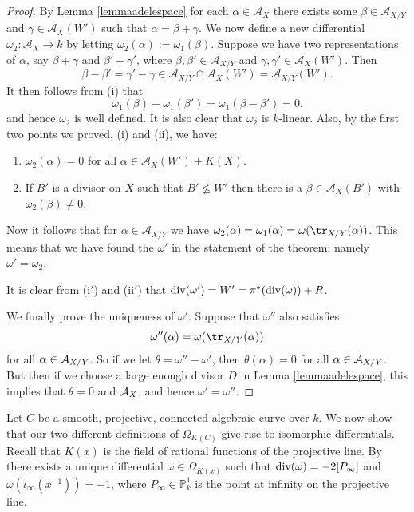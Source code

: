 \begin{proof}
    By Lemma \ref{lemmaadelespace} for each $\alpha \in \mathcal{A}_X$ there exists some $\beta \in \mathcal{A}_{X/Y}$ and $\gamma \in \mathcal{A}_X(W')$ such that $\alpha = \beta + \gamma$.
    We now define a new differential $\omega_2 \colon  \mathcal{A}_X \rightarrow k$ by letting $\omega_2(\alpha) := \omega_1(\beta)$.
    Suppose we have two representations of $\alpha$, say $\beta+ \gamma$ and $\beta' + \gamma'$, where $\beta, \beta' \in \mathcal{A}_{X/Y}$ and $\gamma, \gamma' \in \mathcal{A}_{X}(W')$.
    Then 
        \[
        \beta - \beta' = \gamma' - \gamma \in \mathcal{A}_{X/Y} \cap \mathcal{A}_X(W') = \mathcal{A}_{X/Y}(W').
        \]
    It then follows from (i) that 
        \[
        \omega_1(\beta) - \omega_1(\beta') = \omega_1(\beta - \beta') = 0.
        \]
    and hence $\omega_2$ is well defined.
    It is also clear that $\omega_2$ is $k$-linear.
    Also, by the first two points we proved, (i) and (ii), we have:
        \begin{enumerate}[(i$'$)]
        \item $\omega_2(\alpha) = 0$ for all $\alpha \in \mathcal{A}_X(W') + K(X)$.
        \item If $B'$ is a divisor on $X$ such that $B'\nleq W'$ then there is a $\beta \in \mathcal{A}_X(B')$ with $\omega_2(\beta) \neq 0$.
        \end{enumerate}
    
    
    Now it follows that for $\alpha \in \mathcal{A}_{X/Y}$ we have $\omega_2(\alpha) = \omega_1(\alpha) = \omega(\tr_{X/Y}(\alpha))$.
    This means that we have found the $\omega'$ in the statement of the theorem; namely $\omega' = \omega_2$.
    
    It is clear from (i$'$) and (ii$'$) that $\operatorname{div}(\omega') = W' = \pi^*(\operatorname{div}(\omega)) + R$.
    
    We finally prove the uniqueness of $\omega'$.
    Suppose that $\omega''$ also satisfies 
        \[
        \omega''(\alpha) = \omega(\tr_{X/Y}(\alpha))
        \]
    for all $\alpha\in {\mathcal A}_{X/Y}$.
    So if we let $\theta = \omega'' - \omega'$, then $\theta(\alpha) = 0$ for all $\alpha \in {\mathcal A}_{X/Y}$.
    But then if we choose a large enough divisor $D$ in Lemma \ref{lemmaadelespace}, this implies that $\theta = 0$ and ${\mathcal A}_X$, and hence $\omega' = \omega''$.
    \end{proof}





Let $C$ be a smooth, projective, connected algebraic curve over $k$.
We now show that our two different definitions of $\Omega_{K(C)}$ give rise to isomorphic differentials.
Recall that $K(x)$ is the field of rational functions of the projective line.
By \cite[Prop. 1.7.4]{stichtenoth} there exists a unique differential $\omega \in \Omega_{K(x)}$ such that $\operatorname{div} (\omega) = -2[P_{\infty}]$ and $\omega(\iota_\infty(x^{-1})) = -1$, where $P_\infty \in \mathbb P_k^1$ is the point at infinity on the projective line.



